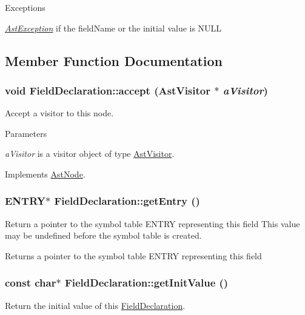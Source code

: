 \begin{DoxyExceptions}{Exceptions}
\item[{\em \hyperlink{classAstException}{AstException}}]if the fieldName or the initial value is NULL \end{DoxyExceptions}


\subsection{Member Function Documentation}
\hypertarget{classFieldDeclaration_a60ce09d75a5864803ca3b24530267af1}{
\subsubsection[{accept}]{\setlength{\rightskip}{0pt plus 5cm}void FieldDeclaration::accept ({\bf AstVisitor} $\ast$ {\em aVisitor})}}
\label{classFieldDeclaration_a60ce09d75a5864803ca3b24530267af1}
Accept a visitor to this node. 
\begin{DoxyParams}{Parameters}
\item[{\em aVisitor}]is a visitor object of type \hyperlink{classAstVisitor}{AstVisitor}. \end{DoxyParams}


Implements \hyperlink{classAstNode_a67b2d6ce1262da2954fb4db255759fb3}{AstNode}.\hypertarget{classFieldDeclaration_a133d01ba5677049a2fb8eeebc91229c0}{
\subsubsection[{getEntry}]{\setlength{\rightskip}{0pt plus 5cm}ENTRY$\ast$ FieldDeclaration::getEntry ()}}
\label{classFieldDeclaration_a133d01ba5677049a2fb8eeebc91229c0}
Return a pointer to the symbol table ENTRY representing this field This value may be undefined before the symbol table is created.

\begin{DoxyReturn}{Returns}
a pointer to the symbol table ENTRY representing this field 
\end{DoxyReturn}
\hypertarget{classFieldDeclaration_afaef5c16cd739826c2e1463666690e95}{
\subsubsection[{getInitValue}]{\setlength{\rightskip}{0pt plus 5cm}const char$\ast$ FieldDeclaration::getInitValue ()}}
\label{classFieldDeclaration_afaef5c16cd739826c2e1463666690e95}
Return the initial value of this \hyperlink{classFieldDeclaration}{FieldDeclaration}.

